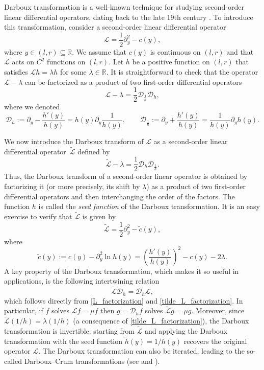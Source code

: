 \documentclass[pdftex]{sigma}
\numberwithin{equation}{section}
\theoremstyle{definition}
\def\L{{\mathcal L}}
\def\D{{\mathcal D}}
\def\r{{\mathbb R}}
\begin{document}
Darboux transformation is a well-known technique for studying second-order linear differential operators, dating back to the late 19th century \cite{Darboux_1882}.
To introduce this transformation, consider a second-order linear differential operator
 \begin{equation}\label{def_L}
 {\mathcal L}=\frac{1}{2} \partial_y^2 - c(y),
 \end{equation}
 where $y \in (l,r)\subseteq \r$. We assume that $c(y)$ is continuous on $(l,r)$ and that $\L$ acts on $C^2$ functions on $(l,r)$. Let $h$ be a positive function on $(l,r)$ that satisfies $\L h = \lambda h$ for some $\lambda \in \r$. It is straightforward to check that the operator $\L-\lambda$ can be factorized as a product of two first-order differential operators
 \begin{equation}\label{L_factorization}
 \L-\lambda =\frac{1}{2}\D_{\frac{1}{h}} \D_h,
 \end{equation}
 where we denoted
\[
{\mathcal D}_{h}:=\partial_y-\frac{h'(y)}{h(y)}=h(y) \partial_y \frac{1}{h(y)}, \qquad
{\mathcal D}_{\frac{1}{h}}:=\partial_y+\frac{h'(y)}{h(y)}=\frac{1}{h(y)} \partial_y h(y).
\]

We now introduce the Darboux transform of $\L$ as a second-order linear differential operator~$\widetilde \L$ defined by
 \begin{equation}\label{tilde_L_factorization}
 \widetilde \L-\lambda =\frac{1}{2}\D_h \D_{\frac{1}{h}}.
 \end{equation}
Thus, the Darboux transform of a second-order linear operator is obtained by factorizing it (or more precisely, its shift by $\lambda$) as a product of two first-order differential operators and then interchanging the order of the factors. The function $h$ is called the {\it seed function} of the Darboux transformation. It is an easy exercise to verify that $\widetilde \L$ is given by
\begin{equation}\label{def_tilde_L}
\widetilde \L = \frac{1}{2} \partial_y^2 - \tilde c(y),
\end{equation}
where
\[
\tilde c(y):=c(y) - \partial_y^2 \ln h(y)=\left(\frac{h'(y)}{h(y)}\right)^2-c(y)-2\lambda.
\]
A key property of the Darboux transformation, which makes it so useful in applications, is the following intertwining relation
\begin{equation}\label{L_tilde_L_intertwining}
 \widetilde \L \D_h = \D_h \L,
\end{equation}
which follows directly from \eqref{L_factorization} and \eqref{tilde_L_factorization}. In particular, if $f$ solves $\L f=\mu f$ then
$g=\D_h f$ solves $\widetilde \L g=\mu g$. Moreover, since $\widetilde \L (1/h)=\lambda (1/h)$ (a consequence of
\eqref{tilde_L_factorization}), the Darboux transformation is invertible: starting from $\widetilde \L$ and applying the Darboux transformation with the seed function $\tilde h(y)=1/h(y)$ recovers the original operator $\L$. The Darboux transformation can also be iterated, leading to the so-called Darboux--Crum transformations (see \cite{Crum_1955} and \cite[Section 2.4]{Gomez_2020}).
\end{document}
